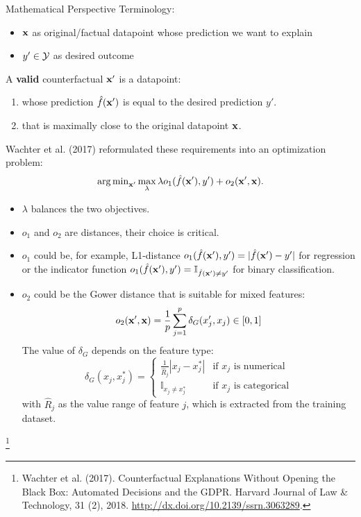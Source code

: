 \documentclass[11pt,compress,t,notes=noshow, xcolor=table]{beamer}
\begin{document}
\begin{vbframe}{Mathematical Perspective}
	Terminology: 
	\begin{itemize}
		\item $\xv$ as original/factual datapoint whose prediction we want to explain
		\item $y' \in \Yspace$ as desired outcome 
	\end{itemize}
	\vspace{0.3cm}
	A \textbf{valid} counterfactual $\xv'$ is a datapoint: 
	\begin{enumerate}
		\item whose prediction $\fh(\xv')$ is equal to the desired prediction $y'$. 
		\item that is maximally close to the original datapoint $\xv$.
	\end{enumerate}
	Wachter et al. (2017) reformulated these requirements into an optimization problem: 
	\begin{equation}
		\argmin_{\xv'} \max_{\lambda} \lambda o_1(\fh(\xv'), y') + o_2(\xv', \xv).
		\label{eq:wachter}
	\end{equation}
	\begin{itemize}
		\item $\lambda$ balances the two objectives.
		\item $o_1$ and $o_2$ are distances, their choice is critical.
		\framebreak
		\item $o_1$ could be, for example, L1-distance $o_1(\fh(\xv'), y') = |\fh(\xv')-y'|$ for regression or the indicator function $o_1(\fh(\xv'), y') = \mathbb{I}_{\fh(\xv') \neq y'}$ for binary classification.
		\item $o_2$ could be the Gower distance that is suitable for mixed features: 
		$$o_2(\xv', \xv) = \frac{1}{p}\sum_{j = 1}^{p} \delta_G(x'_j, x_j)\in [0, 1]$$
		The value of $\delta_G$ depends on the feature type:
		\begin{equation*}
		\delta_G(x_j, x^*_j) = 
		\begin{cases}
		\frac{1}{\widehat{R}_j}|x_j- x^*_j| & \text{if $x_j$ is numerical} \\
		\mathbb{I}_{x_j \neq x_j^*} & \text{if $x_j$ is categorical}
		\end{cases}
		\end{equation*}
		with $\widehat{R}_j$ as the value range of feature $j$, which is extracted from the training dataset. 
	\end{itemize}

\footnote[frame]{Wachter et al. (2017). Counterfactual Explanations Without Opening the Black Box: Automated Decisions and the GDPR. Harvard Journal of Law \& Technology, 31 (2), 2018. \url{http://dx.doi.org/10.2139/ssrn.3063289}.}
\end{vbframe}
\end{document}
